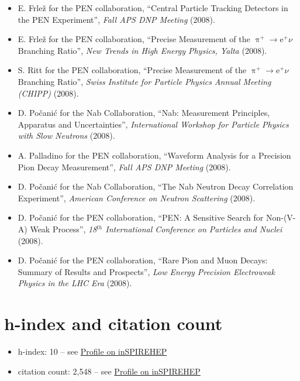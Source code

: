 \documentclass[10pt]{article}
\begin{document}
\begin{itemize}
Barron-Palos L, Alarcon R, Alonzi LP, B.Lauss, et al. ``Measurement of parity-violating neutron capture gamma asymmetries at low-energies'' XXXII Symposium on Nuclear Physics, Hotel Hacienda, Morelos, Mexico, January 5-8,2009, Revista Mexicana De Fisica Vol. 55, 2 (2009) 18-22.
\item E. Frle\v{z} for the PEN collaboration, ``Central Particle Tracking Detectors in the PEN Experiment'', \emph{Fall APS DNP Meeting} (2008).
\item E. Frle\v{z} for the PEN collaboration, ``Precise Measurement of the $\uppi^{+}\rightarrow\mathrm{e}^{+}\nu$ Branching Ratio'', \emph{New Trends in High Energy Physics, Yalta} (2008).
\item S. Ritt for the PEN collaboration, ``Precise Measurement of the $\uppi^{+}\rightarrow\mathrm{e}^{+}\nu$ Branching Ratio'', \emph{Swiss Institute for Particle Physics Annual Meeting (CHIPP)} (2008).
\item D. Po\v{c}ani\'c for the Nab Collaboration, ``Nab: Measurement Principles, Apparatus and Uncertainties'', \emph{International Workshop for Particle Physics with Slow Neutrons} (2008).
\item A. Palladino for the PEN collaboration, ``Waveform Analysis for a Precision Pion Decay Measurement'', \emph{Fall APS DNP Meeting} (2008).
\item D. Po\v{c}ani\'c for the Nab Collaboration, ``The Nab Neutron Decay Correlation Experiment'', \emph{American Conference on Neutron Scattering} (2008).
\item D. Po\v{c}ani\'c for the PEN collaboration, ``PEN: A Sensitive Search for Non-(V-A) Weak Process'', \emph{18$^{th}$ International Conference on Particles and Nuclei} (2008).
\item D. Po\v{c}ani\'c for the PEN collaboration, ``Rare Pion and Muon Decays: Summary of Results and Prospects'', \emph{Low Energy Precision Electroweak Physics in the LHC Era} (2008).
\end{itemize}

\section*{h-index and citation count}
\begin{itemize}
\item h-index: 10 -- see \href{https://inspirehep.net/authors/1191633}{Profile on inSPIREHEP}
\item citation count: 2,548 -- see \href{https://inspirehep.net/authors/1191633}{Profile on inSPIREHEP}
\end{itemize}
\end{document}
